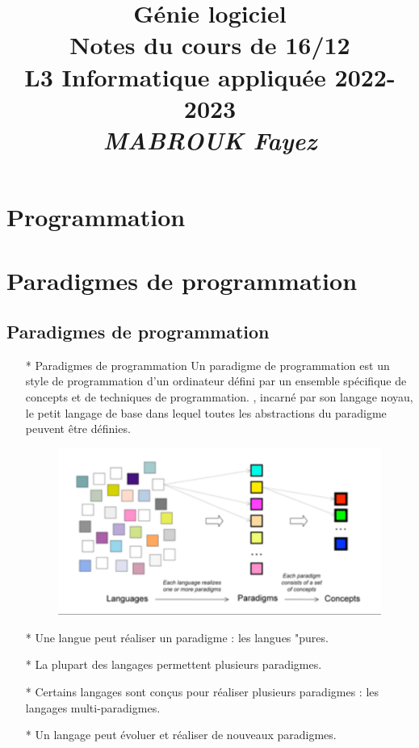 \documentclass[12pt]{article}
\title{{\bf  Génie logiciel} \\
	Notes du cours de 16/12  \\
	{\small L3 Informatique appliquée 2022-2023} \\
	{\it \small MABROUK Fayez}}
\begin{document}
	\maketitle
	\newpage
	\section{Programmation}
	\section{Paradigmes de programmation}
	\subsection{Paradigmes de programmation}
	\begin{itemize}
		\item[* ] Paradigmes de programmation
		Un paradigme de programmation est un style de programmation d'un ordinateur défini par un ensemble spécifique de concepts et de techniques de programmation.
		, incarné par son langage noyau, le petit langage de base dans lequel toutes les abstractions du paradigme peuvent être définies.
		\begin{figure}[!hbtp]
			\centering
			\includegraphics[scale=0.75]{Capture.PNG}
		\end{figure}
		\item[* ] Une langue peut réaliser un
		paradigme : les langues "pures.
		\item[* ] La plupart des langages permettent plusieurs
		paradigmes.
		\item[* ] Certains langages sont conçus
		pour réaliser plusieurs paradigmes :
		les langages multi-paradigmes.
		\item[* ] Un langage peut évoluer et
		réaliser de nouveaux paradigmes.
	\end{itemize}
\end{document}
